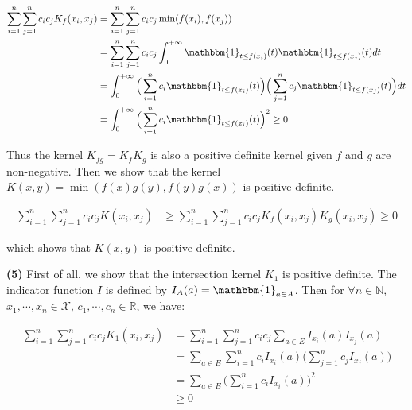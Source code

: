 \documentclass[11pt]{article}
\begin{document}
    \vspace{-4.5em}
    \begin{align*}
      \sum_{i=1}^n \sum_{j=1}^n c_i c_j K_f(x_i, x_j) &= \sum_{i=1}^n \sum_{j=1}^n c_i c_j \min(f(x_i), f(x_j)) \\
      &= \sum_{i=1}^n \sum_{j=1}^n c_i c_j \int_0^{+\infty} \mathbbm{1}_{t \le f(x_i)} (t) \mathbbm{1}_{t \le f(x_j)} (t) dt \\
      &= \int_0^{+\infty} \Big (\sum_{i=1}^n c_i \mathbbm{1}_{t \le f(x_i)} (t) \Big ) \Big (\sum_{j=1}^n c_j \mathbbm{1}_{t \le f(x_j)} (t) \Big ) dt \\
      &= \int_0^{+\infty} \Big (\sum_{i=1}^n c_i \mathbbm{1}_{t \le f(x_i)} (t) \Big )^2 \ge 0
    \end{align*}
    \vspace{-4em}

    Thus the kernel $K_{fg} = K_f K_g$ is also a positive definite kernel given $f$ and $g$ are non-negative.
    Then we show that the kernel $K(x, y) = \min(f(x)g(y), f(y)g(x))$ is positive definite.

    \vspace{-4em}
    \begin{align*}
      \sum_{i=1}^n \sum_{j=1}^n c_i c_j K(x_i, x_j) &\ge \sum_{i=1}^n \sum_{j=1}^n c_i c_j K_f(x_i, x_j) K_g(x_i, x_j) \ge 0
    \end{align*}
    \vspace{-4em}

    which shows that $K(x, y)$ is positive definite.


    \textbf{(5)} First of all, we show that the intersection kernel $K_1$ is positive definite.  
    The indicator function $I$ is defined by $I_A(a) = \mathbbm{1}_{a \in A}$.
    Then for $\forall n \in \mathbb{N}$, $x_1, \cdots, x_n \in \mathcal{X}$, $c_1, \cdots, c_n \in \mathbb{R}$, we have:

    \vspace{-4em}
    \begin{align*}
      \sum_{i=1}^n \sum_{j=1}^n c_i c_j K_1(x_i, x_j) &= \sum_{i=1}^n \sum_{j=1}^n c_i c_j \sum_{a \in E} I_{x_i}(a) I_{x_j}(a) \\
      &= \sum_{a \in E} \sum_{i=1}^n c_i I_{x_i} (a) \big ( \sum_{j=1}^n c_j I_{x_j} (a) \big ) \\
      &= \sum_{a \in E} \Big ( \sum_{i=1}^n c_i I_{x_i}(a) \Big )^2 \\
      & \ge 0
    \end{align*}
    \vspace{-4em}
\end{document}
